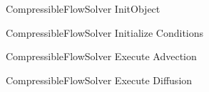 \clearpage
   \begin{figure}
          \caption{CompressibleFlowSolver InitObject}\label{fig1}
        \centering
        
    \end{figure}

\clearpage
   \begin{figure}
          \caption{CompressibleFlowSolver Initialize Conditions}\label{fig2}
        \centering
        
    \end{figure}

\clearpage
   \begin{figure}
          \caption{CompressibleFlowSolver Execute Advection}\label{fig3}
        \centering
        
   \end{figure}

\clearpage
   \begin{figure}
          \caption{CompressibleFlowSolver Execute Diffusion}\label{fig4}
        \centering
        
   \end{figure}









